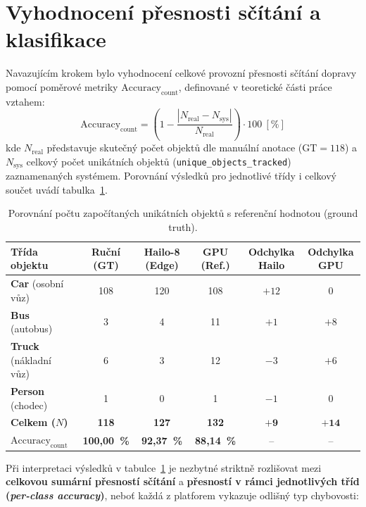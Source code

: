\documentclass[male,czech,api_bc]{kitheses}
\renewcommand{\arraystretch}{1.23}
\begin{document}
\section{Vyhodnocení přesnosti sčítání a klasifikace}
Navazujícím krokem bylo vyhodnocení celkové provozní přesnosti sčítání dopravy pomocí poměrové metriky $\text{Accuracy}_{\text{count}}$, definované v teoretické části práce vztahem:
\[
\text{Accuracy}_{\text{count}} = \left(1 - \frac{|N_{\text{real}} - N_{\text{sys}}|}{N_{\text{real}}}\right) \cdot 100~[\%]
\]
kde $N_{\text{real}}$ představuje skutečný počet objektů dle manuální anotace ($\text{GT} = 118$) a $N_{\text{sys}}$ celkový počet unikátních objektů (\texttt{unique\_objects\_tracked}) zaznamenaných systémem. Porovnání výsledků pro jednotlivé třídy i celkový součet uvádí tabulka~\ref{tab:counting_results}.

\begin{table}[H]
    \centering
    \small\renewcommand{\arraystretch}{1.2}
    \setlength{\tabcolsep}{3pt}
    \begin{tabular}{|l|c|c|c|c|c|}
        \hline
        \textbf{Třída objektu} & \textbf{Ruční (GT)} & \textbf{Hailo-8 (Edge)} & \textbf{GPU (Ref.)} & \textbf{Odchylka Hailo} & \textbf{Odchylka GPU} \\ \hline
        \textbf{Car} (osobní vůz) & 108 & 120 & 108 & $+12$ & $0$ \\ \hline
        \textbf{Bus} (autobus) & 3 & 4 & 11 & $+1$ & $+8$ \\ \hline
        \textbf{Truck} (nákladní vůz) & 6 & 3 & 12 & $-3$ & $+6$ \\ \hline
        \textbf{Person} (chodec) & 1 & 0 & 1 & $-1$ & $0$ \\ \hline \hline
        \textbf{Celkem ($N$)} & \textbf{118} & \textbf{127} & \textbf{132} & $\mathbf{+9}$ & $\mathbf{+14}$ \\ \hline
        \textbf{$\text{Accuracy}_{\text{count}}$} & \textbf{100,00~\%} & \textbf{92,37~\%} & \textbf{88,14~\%} & -- & -- \\ \hline
    \end{tabular}
    \caption{Porovnání počtu započítaných unikátních objektů s referenční hodnotou (ground truth).}
    \label{tab:counting_results}
\end{table}

Při interpretaci výsledků v tabulce~\ref{tab:counting_results} je nezbytné striktně rozlišovat mezi \textbf{celkovou sumární přesností sčítání} a \textbf{přesností v rámci jednotlivých tříd (\textit{per-class accuracy})}, neboť každá z platforem vykazuje odlišný typ chybovosti:
\end{document}
